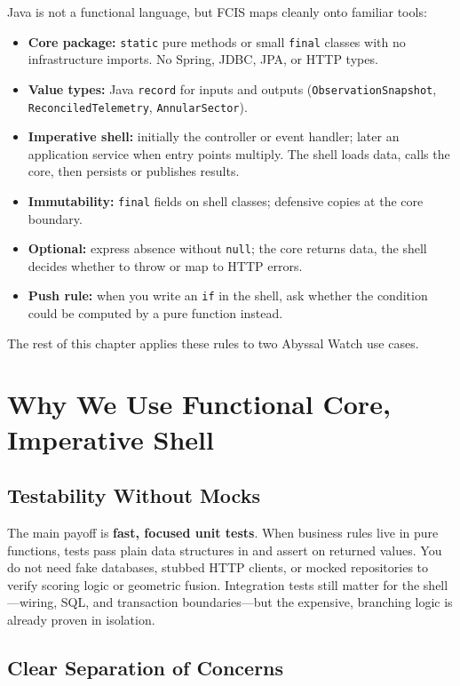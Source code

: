 Java is not a functional language, but FCIS maps cleanly onto familiar tools:
\begin{itemize}
    \item \textbf{Core package:} \texttt{static} pure methods or small \texttt{final} classes with no infrastructure imports. No Spring, JDBC, JPA, or HTTP types.
    \item \textbf{Value types:} Java \texttt{record} for inputs and outputs (\texttt{ObservationSnapshot}, \texttt{ReconciledTelemetry}, \texttt{AnnularSector}).
    \item \textbf{Imperative shell:} initially the controller or event handler; later an application service when entry points multiply. The shell loads data, calls the core, then persists or publishes results.
    \item \textbf{Immutability:} \texttt{final} fields on shell classes; defensive copies at the core boundary.
    \item \textbf{Optional:} express absence without \texttt{null}; the core returns data, the shell decides whether to throw or map to HTTP errors.
    \item \textbf{Push rule:} when you write an \texttt{if} in the shell, ask whether the condition could be computed by a pure function instead.\autocite{googleFcis2025}
\end{itemize}
The rest of this chapter applies these rules to two Abyssal Watch use cases.

\section{Why We Use Functional Core, Imperative Shell}
\label{sec:fcis_why}

\subsection{Testability Without Mocks}
\label{sec:fcis_why_testability}

The main payoff is \textbf{fast, focused unit tests}. When business rules live in pure functions, tests pass plain data structures in and assert on returned values. You do not need fake databases, stubbed HTTP clients, or mocked repositories to verify scoring logic or geometric fusion. Integration tests still matter for the shell---wiring, SQL, and transaction boundaries---but the expensive, branching logic is already proven in isolation.

\subsection{Clear Separation of Concerns}
\label{sec:fcis_why_separation}

